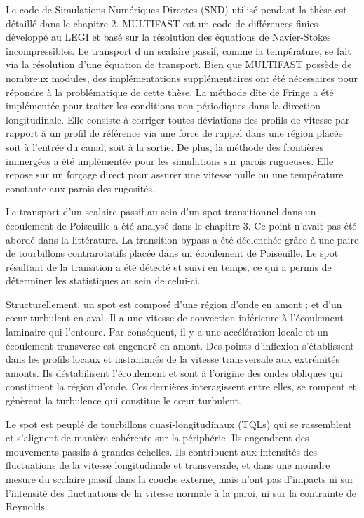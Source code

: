 \vspace{1cm}
Le code de Simulations Numériques Directes (SND) utilisé pendant la thèse est détaillé dans le chapitre 2. MULTIFAST est un code de différences finies développé au LEGI et basé sur la résolution des équations de Navier-Stokes incompressibles. Le transport d'un scalaire passif, comme la température, se fait via la résolution d'une équation de transport. Bien que MULTIFAST possède de nombreux modules, des implémentations supplémentaires ont été nécessaires pour répondre à la problématique de cette thèse. La méthode dîte de Fringe a été implémentée pour traiter les conditions non-périodiques dans la direction longitudinale. Elle consiste à corriger toutes déviations des profils de vitesse par rapport à un profil de référence via une force de rappel dans une région placée soit à l'entrée du canal, soit à la sortie. De plus, la méthode des frontières immergées a été implémentée pour les simulations sur parois rugueuses. Elle repose sur un forçage direct pour assurer une vitesse nulle ou une température constante aux parois des rugosités.
\vfill\null

\clearpage
Le transport d'un scalaire passif au sein d'un spot transitionnel dans un écoulement de Poiseuille a été analysé dans le chapitre 3. Ce point n'avait pas été abordé dans la littérature. La transition bypass a été déclenchée grâce à une paire de tourbillons contrarotatifs placée dans un écoulement de Poiseuille. Le spot résultant de la transition a été détecté et suivi en temps, ce qui a permis de déterminer les statistiques au sein de celui-ci.

Structurellement, un spot est composé d'une région d'onde en amont ; et d'un cœur turbulent en aval. Il a une vitesse de convection inférieure à l'écoulement laminaire qui l'entoure. Par conséquent, il y a une accélération locale et un écoulement transverse est engendré en amont. Des points d'inflexion s'établissent dans les profils locaux et instantanés de la vitesse transversale aux extrémités amonts. Ils déstabilisent l'écoulement et sont à l'origine des ondes obliques qui constituent la région d'onde. Ces dernières interagissent entre elles, se rompent et génèrent la turbulence qui constitue le cœur turbulent. 

Le spot est peuplé de tourbillons quasi-longitudinaux (TQLs) qui se rassemblent et s’alignent de manière cohérente sur la périphérie. Ils engendrent des mouvements passifs à grandes échelles. Ils contribuent aux intensités des fluctuations de la vitesse longitudinale et transversale, et dans une moindre mesure du scalaire passif dans la couche externe, mais n'ont pas d'impacts ni sur l'intensité des fluctuations de la vitesse normale à la paroi, ni sur la contrainte de Reynolds. 


